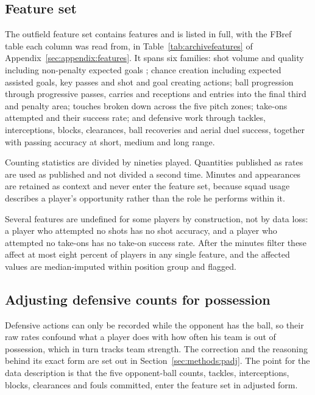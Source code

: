 \subsection{Feature set}

The outfield feature set contains \ArcFeatures{} features and is listed in full, with the
FBref table each column was read from, in Table~\ref{tab:archivefeatures} of
Appendix~\ref{sec:appendix:features}. It spans six families: shot volume and quality
including non-penalty expected goals \citep{eggels2016explaining, rathke2017examination}; chance creation including expected assisted goals,
key passes and shot and goal creating actions; ball progression through progressive passes,
carries and receptions and entries into the final third and penalty area; touches broken
down across the five pitch zones; take-ons attempted and their success rate; and defensive
work through tackles, interceptions, blocks, clearances, ball recoveries and aerial duel
success, together with passing accuracy at short, medium and long range.

Counting statistics are divided by nineties played. Quantities published as rates are used
as published and not divided a second time. Minutes and appearances are retained as
context and never enter the feature set, because squad usage describes a player's
opportunity rather than the role he performs within it.

Several features are undefined for some players by construction, not by data loss: a
player who attempted no shots has no shot accuracy, and a player who attempted no take-ons
has no take-on success rate. After the minutes filter these affect at most eight percent of
players in any single feature, and the affected values are median-imputed within position
group and flagged.

\subsection{Adjusting defensive counts for possession}
\label{sec:data:padj}

Defensive actions can only be recorded while the opponent has the ball, so their raw rates
confound what a player does with how often his team is out of possession, which in turn
tracks team strength. The correction and the reasoning behind its exact form are set out in
Section~\ref{sec:methods:padj}. The point for the data description is that the five
opponent-ball counts, tackles, interceptions, blocks, clearances and fouls committed, enter
the feature set in adjusted form.


